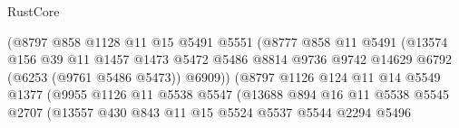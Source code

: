 \begin{lexlean}{RustCore}
\begin{coremodule}
                                    (@8797
                                      @858
                                      @1128
                                      @11
                                      @15
                                      @5491
                                      @5551
                                      (@8777
                                        @858
                                        @11
                                        @5491
                                        (@13574
                                          @156
                                          @39
                                          @11
                                          @1457
                                          @1473
                                          @5472
                                          @5486
                                          @8814
                                          @9736
                                          @9742
                                          @14629
                                          @6792
                                          (@6253 (@9761 @5486 @5473))
                                          @6909))
                                      (@8797
                                        @1126
                                        @124
                                        @11
                                        @14
                                        @5549
                                        @1377
                                        (@9955
                                          @1126
                                          @11
                                          @5538
                                          @5547
                                          (@13688
                                            @894
                                            @16
                                            @11
                                            @5538
                                            @5545
                                            @2707
                                            (@13557
                                              @430
                                              @843
                                              @11
                                              @15
                                              @5524
                                              @5537
                                              @5544
                                              @2294
                                              @5496

\end{coremodule}
\end{lexlean}
